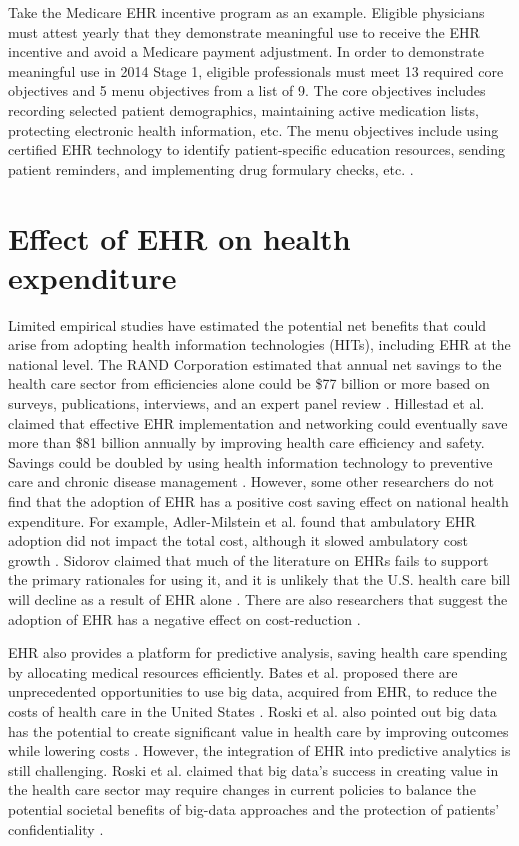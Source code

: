 \documentclass[12pt]{report}
\begin{document}
Take the Medicare EHR incentive program as an example. Eligible physicians must attest yearly that they demonstrate meaningful use to receive the EHR incentive and avoid a Medicare payment adjustment. In order to demonstrate meaningful use in 2014 Stage 1, eligible professionals must meet 13 required core objectives and 5 menu objectives from a list of 9. The core objectives includes recording selected patient demographics, maintaining active medication lists, protecting electronic health information, etc. The menu objectives include using certified EHR technology to identify patient-specific education resources, sending patient reminders, and implementing drug formulary checks, etc. \citep{stage1}.

\section{Effect of EHR on health expenditure}

Limited empirical studies have estimated the potential net benefits that could arise from adopting health information technologies (HITs), including EHR at the national level. The RAND Corporation estimated that annual net savings to the health care sector from efficiencies alone could be \$77 billion or more based on surveys, publications, interviews, and an expert panel review \citep{Rand2005}. Hillestad et al. claimed that effective EHR implementation and networking could eventually save more than \$81 billion annually by improving health care efficiency and safety. Savings could be doubled by using health information technology to preventive care and chronic disease management \citep{Hillestad2005}. However, some other researchers do not find that the adoption of EHR has a positive cost saving effect on national health expenditure. For example, Adler-Milstein et al. found that ambulatory EHR adoption did not impact the total cost, although it slowed ambulatory cost growth \citep{Adler-Milstein2013}. Sidorov claimed that much of the literature on EHRs fails to support the primary rationales for using it, and it is unlikely that the U.S. health care bill will decline as a result of EHR alone \citep{Sidorov2006}. There are also researchers that suggest the adoption of EHR has a negative effect on cost-reduction  \citep{Teufel2012}.

EHR also provides a platform for predictive analysis, saving health care spending by allocating medical resources efficiently. Bates et al. proposed there are unprecedented opportunities to use big data, acquired from EHR, to reduce the costs of health care in the United States \citep{Bates2014}. Roski et al. also pointed out big data has the potential to create significant value in health care by improving outcomes while lowering costs \citep{Roski2014}. However, the integration of EHR into predictive analytics is still challenging. Roski et al. claimed that big data's success in creating value in the health care sector may require changes in current policies to balance the potential societal benefits of big-data approaches and the protection of patients' confidentiality \citep{Roski2014}.
\end{document}
